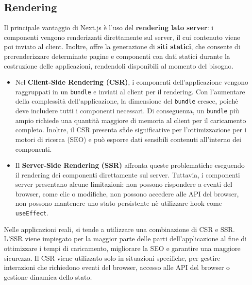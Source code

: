 \documentclass[target=bach,aauheader=,style=]{thud}
\begin{document}
\subsection{Rendering}
Il principale vantaggio di Next.js è l'uso del \textbf{rendering lato server}: i componenti vengono renderizzati direttamente sul server, il cui contenuto viene poi inviato al client. Inoltre, offre la generazione di \textbf{siti statici}, che consente di prerenderizzare determinate pagine e componenti con dati statici durante la costruzione delle applicazioni, rendendoli disponibili al momento del bisogno.

\begin{itemize}
    \item Nel \textbf{Client-Side Rendering (CSR)}, i componenti dell'applicazione vengono raggruppati in un \texttt{bundle} e inviati al client per il rendering. Con l'aumentare della complessità dell'applicazione, la dimensione del \texttt{bundle} cresce, poichè deve includere tutti i componenti necessari. Di conseguenza, un \texttt{bundle} più ampio richiede una quantità maggiore di memoria al client per il caricamento completo. Inoltre, il CSR presenta sfide significative per l'ottimizzazione per i motori di ricerca (SEO) e può esporre dati sensibili contenuti all'interno dei componenti.

    \item Il \textbf{Server-Side Rendering (SSR)} affronta queste problematiche eseguendo il rendering dei componenti direttamente sul server. Tuttavia, i componenti server presentano alcune limitazioni: non possono rispondere a eventi del browser, come clic o modifiche, non possono accedere alle API del browser, non possono mantenere uno stato persistente nè utilizzare hook come \texttt{useEffect}.
\end{itemize}

\noindent Nelle applicazioni reali, si tende a utilizzare una combinazione di CSR e SSR. L'SSR viene impiegato per la maggior parte delle parti dell'applicazione al fine di ottimizzare i tempi di caricamento, migliorare la SEO e garantire una maggiore sicurezza. Il CSR viene utilizzato solo in situazioni specifiche, per gestire interazioni che richiedono eventi del browser, accesso alle API del browser o gestione dinamica dello stato.
\end{document}
